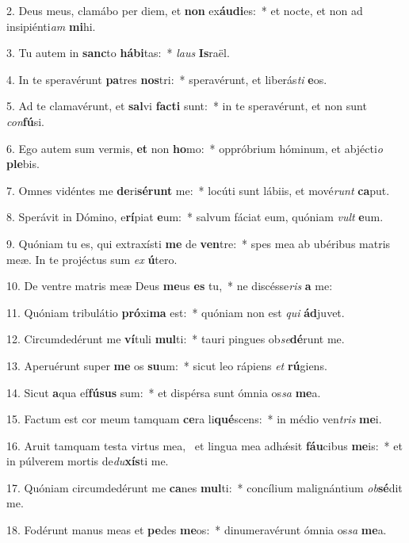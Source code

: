 2. Deus meus, clamábo per diem, et \textbf{non} ex\textbf{áu}\textbf{di}es:~*  et nocte, et non ad insipiénti\textit{am} \textbf{mi}hi.\

3. Tu autem in \textbf{sanc}to \textbf{há}\textbf{bi}tas:~*  \textit{laus} \textbf{Is}raël.\

4. In te speravérunt \textbf{pa}tres \textbf{nos}tri:~*  speravérunt, et liberás\textit{ti} \textbf{e}os.\

5. Ad te clamavérunt, et \textbf{sal}vi \textbf{fac}\textbf{ti} sunt:~*  in te speravérunt, et non sunt \textit{con}\textbf{fú}si.\

6. Ego autem sum vermis, \textbf{et} non \textbf{ho}mo:~*  oppróbrium hóminum, et abjécti\textit{o} \textbf{ple}bis.\

7. Omnes vidéntes me \textbf{de}ri\textbf{sé}\textbf{runt} me:~*  locúti sunt lábiis, et mové\textit{runt} \textbf{ca}put.\

8. Sperávit in Dómino, e\textbf{rí}piat \textbf{e}um:~*  salvum fáciat eum, quóniam \textit{vult} \textbf{e}um.\

9. Quóniam tu es, qui extraxísti \textbf{me} de \textbf{ven}tre:~*  spes mea ab ubéribus matris meæ. In te projéctus sum \textit{ex} \textbf{ú}tero.\

10. De ventre matris meæ Deus \textbf{me}us \textbf{es} tu,~*  ne discésse\textit{ris} \textbf{a} me:\

11. Quóniam tribulátio \textbf{pró}xi\textbf{ma} est:~*  quóniam non est \textit{qui} \textbf{ád}juvet.\

12. Circumdedérunt me \textbf{ví}tuli \textbf{mul}ti:~*  tauri pingues ob\textit{se}\textbf{dé}runt me.\

13. Aperuérunt super \textbf{me} os \textbf{su}um:~*  sicut leo rápiens \textit{et} \textbf{rú}giens.\

14. Sicut \textbf{a}qua ef\textbf{fú}\textbf{sus} sum:~*  et dispérsa sunt ómnia os\textit{sa} \textbf{me}a.\

15. Factum est cor meum tamquam \textbf{ce}ra li\textbf{qué}scens:~*  in médio ven\textit{tris} \textbf{me}i.\

16. Aruit tamquam testa virtus mea, \dag\  et lingua mea adhǽsit \textbf{fáu}cibus \textbf{me}is:~*  et in púlverem mortis de\textit{du}\textbf{xís}ti me.\

17. Quóniam circumdedérunt me \textbf{ca}nes \textbf{mul}ti:~*  concílium malignántium \textit{ob}\textbf{sé}dit me.\

18. Fodérunt manus meas et \textbf{pe}des \textbf{me}os:~*  dinumeravérunt ómnia os\textit{sa} \textbf{me}a.\

